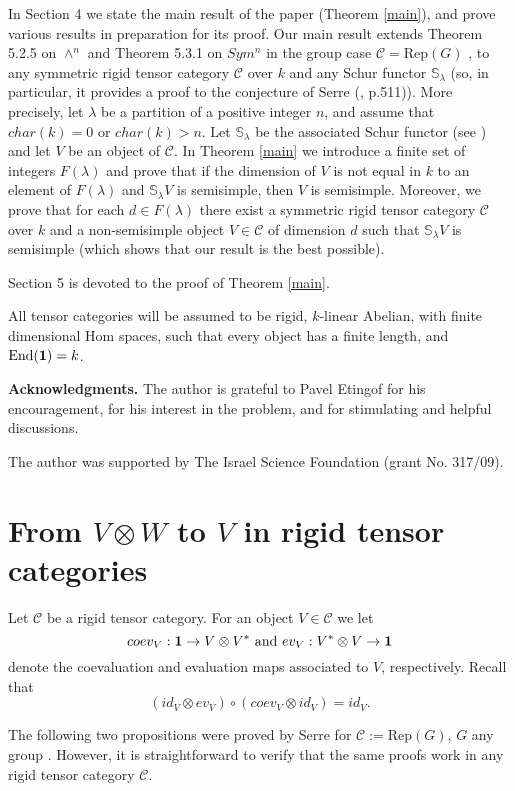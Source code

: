 \documentclass{amsart}
\theoremstyle{definition}
\newcommand{\End}{\text{End}}
\newcommand{\Hom}{\text{Hom}}
\newcommand{\Rep}{\text{Rep}}
\newcommand{\ot}{\otimes}
\newcommand{\C}{{\mathcal C}}
\newcommand{\unit}{{\bf 1}}
\begin{document}
In Section 4 we state the main result of the paper (Theorem
\ref{main}), and prove various results in preparation for its proof.
Our main result extends Theorem 5.2.5 on $\wedge^n$ and Theorem
5.3.1 on $Sym^n$ in the group case $\C=\Rep(G)$ \cite{s1}, to any
symmetric rigid tensor category $\C$ over $k$ and any Schur functor
$\mathbb{S}_{\lambda}$ (so, in particular, it provides a proof to
the conjecture of Serre (\cite{s1}, p.511)). More precisely, let
$\lambda$ be a partition of a positive integer $n$, and assume that
$char(k)=0$ or $char(k)>n$. Let $\mathbb{S}_{\lambda}$ be the
associated Schur functor (see \cite{d2}) and let $V$ be an object of
$\C$. In Theorem \ref{main} we introduce a finite set of integers
$F(\lambda)$ and prove that if the dimension of $V$ is not equal in
$k$ to an element of $F(\lambda)$ and $\mathbb{S}_{\lambda}V$ is
semisimple, then $V$ is semisimple. Moreover, we prove that for each
$d\in F(\lambda)$ there exist a symmetric rigid tensor category $\C$
over $k$ and a non-semisimple object $V\in \C$ of dimension $d$ such
that $\mathbb{S}_{\lambda}V$ is semisimple (which shows that our
result is the best possible).

Section 5 is devoted to the proof of Theorem \ref{main}.

All tensor categories will be assumed to be rigid, $k$-linear
Abelian, with finite dimensional $\Hom$ spaces, such that every
object has a finite length, and $\End(\unit)=k$.

{\bf Acknowledgments.} The author is grateful to Pavel Etingof for
his encouragement, for his interest in the problem, and for
stimulating and helpful discussions.

The author was supported by The Israel Science Foundation (grant No.
317/09).

\section{From $V\otimes W$ to $V$ in rigid
tensor categories}

Let $\mathcal{C}$ be a rigid tensor category. For an object $V\in
\mathcal{C}$ we let
$$coev_V: \unit \to V\otimes V^*\,\,\text{and}\,\, ev_V:
V^*\otimes V\to \unit$$ denote the coevaluation and evaluation maps
associated to $V$, respectively. Recall that $$(id_V\otimes
ev_V)\circ (coev_V\ot id_V)=id_V.$$

The following two propositions were proved by Serre for
$\mathcal{C}:=\Rep(G)$, $G$ any group \cite{s1}. However, it is
straightforward to verify that the same proofs work in any rigid
tensor category $\mathcal{C}$.
\end{document}
